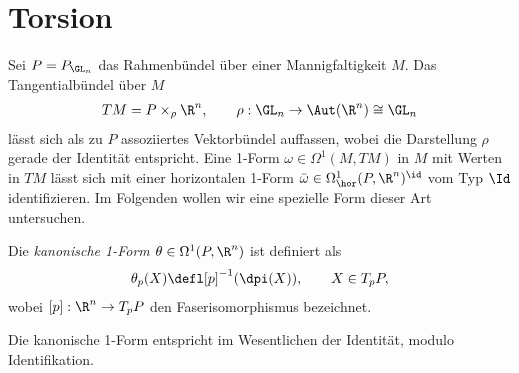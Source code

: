 \documentclass[%
	paper=a5,%
	fleqn,%
	DIV=18,%
	BCOR=0mm,
	fontsize=11pt,
	titlepage=false,%
	bibliography=totoc,
	DIV=18,%
	twoside=true,
	pdftitle=Riemannsche Geometrie,
	pdfauthor=Uwe Semmelmann,
	numbers=noendperiod]%
	{scrbook}
\begin{document}
\section{Torsion}

Sei $P=P_{\GL_n}$ das Rahmenbündel über einer Mannigfaltigkeit $M$. Das
Tangentialbündel über $M$
\begin{align*}
TM = P\times_\rho \R^n,\qquad \rho: \GL_n\to \Aut(\R^n) \cong \GL_n
\end{align*}
lässt sich als zu $P$ assoziiertes Vektorbündel auffassen, wobei die Darstellung
$\rho$ gerade der Identität entspricht. Eine 1-Form $\omega\in \Omega^1(M,TM)$
in $M$ mit Werten in $TM$ lässt sich mit einer horizontalen 1-Form
$\bar{\omega}\in \Omega_\hor^1(P,\R^n)^\id$ vom Typ $\Id$ identifizieren. Im
Folgenden wollen wir eine spezielle Form dieser Art untersuchen.

\begin{defn}
Die \emph{kanonische 1-Form $\theta\in\Omega^1(P,\R^n)$} ist definiert als
\begin{align*}
\theta_p(X) \defl [p]^{-1}(\dpi(X)),\qquad X\in T_pP,
\end{align*}
wobei $[p]: \R^n\to T_pP$ den Faserisomorphismus bezeichnet.\fish
\end{defn}

Die kanonische 1-Form entspricht im Wesentlichen der Identit\"at, modulo Identifikation.
\end{document}
